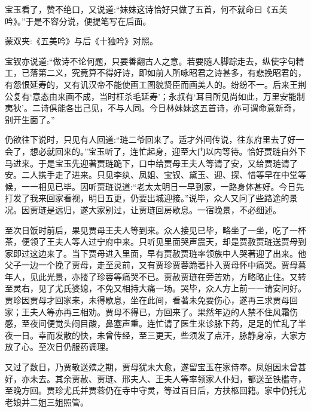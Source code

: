 \begin{parag}
    宝玉看了，赞不绝口，又说道:“妹妹这诗恰好只做了五首，何不就命曰《五美吟》。”于是不容分说，便提笔写在后面。\begin{note}蒙双夹:《五美吟》与后《十独吟》对照。\end{note}宝钗亦说道:“做诗不论何题，只要善翻古人之意。若要随人脚踪走去，纵使字句精工，已落第二义，究竟算不得好诗，即如前人所咏昭君之诗甚多，有悲挽昭君的，有怨恨延寿的，又有讥汉帝不能使画工图貌贤臣而画美人的。纷纷不一。后来王荆公复有‘意态由来画不成，当时枉杀毛延寿’；永叔有‘耳目所见尚如此，万里安能制夷狄’。二诗俱能各出己见，不与人同。今日林妹妹这五首诗，亦可谓命意新奇，别开生面了。”
\end{parag}


\begin{parag}
    仍欲往下说时，只见有人回道:“琏二爷回来了。适才外间传说，往东府里去了好一会了，想必就回来的。”宝玉听了，连忙起身，迎至大门以内等待。恰好贾琏自外下马进来。于是宝玉先迎著贾琏跪下，口中给贾母王夫人等请了安，又给贾琏请了安。二人携手走了进来。只见李纨、凤姐、宝钗、黛玉、迎、探、惜等早在中堂等候，一一相见已毕。因听贾琏说道:“老太太明日一早到家，一路身体甚好。今日先打发了我来回家看视，明日五更，仍要出城迎接。”说毕，众人又问了些路途的景况。因贾琏是远归，遂大家别过，让贾琏回房歇息。一宿晚景，不必细述。
\end{parag}


\begin{parag}
    至次日饭时前后，果见贾母王夫人等到来。众人接见已毕，略坐了一坐，吃了一杯茶，便领了王夫人等人过宁府中来。只听见里面哭声震天，却是贾赦贾琏送贾母到家即过这边来了。当下贾母进入里面，早有贾赦贾琏率领族中人哭著迎了出来。他父子一边一个挽了贾母，走至灵前，又有贾珍贾蓉跪著扑入贾母怀中痛哭。贾母暮年人，见此光景，亦搂了珍蓉等痛哭不已。贾赦贾琏在旁苦劝，方略略止住。又转至灵右，见了尤氏婆媳，不免又相持大痛一场。哭毕，众人方上前一一请安问好。贾珍因贾母才回家来，未得歇息，坐在此间，看著未免要伤心，遂再三求贾母回家；王夫人等亦再三相劝。贾母不得已，方回来了。果然年迈的人禁不住风霜伤感，至夜间便觉头闷目酸，鼻塞声重。连忙请了医生来诊脉下药，足足的忙乱了半夜一日。幸而发散的快，未曾传经，至三更天，些须发了点汗，脉静身凉，大家方放了心。至次日仍服药调理。
\end{parag}


\begin{parag}
    又过了数日，乃贾敬送殡之期，贾母犹未大愈，遂留宝玉在家侍奉。凤姐因未曾甚好，亦未去。其余贾赦、贾琏、邢夫人、王夫人等率领家人仆妇，都送至铁槛寺，至晚方回。贾珍尤氏并贾蓉仍在寺中守灵，等过百日后，方扶柩回籍。家中仍托尤老娘并二姐三姐照管。
\end{parag}


